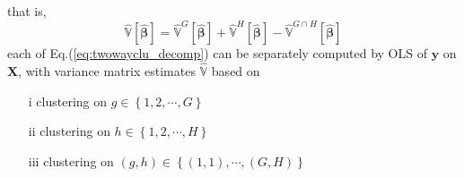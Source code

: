 \documentclass[twoside]{article}
\begin{document}
that is,
\begin{equation}\label{eq:twowayclu_decomp}
    \hat{\mathbb{V}}\left[\hat{\boldsymbol{\beta}}\right] = \hat{\mathbb{V}}^G\left[\hat{\boldsymbol{\beta}}\right] + \hat{\mathbb{V}}^H\left[\hat{\boldsymbol{\beta}}\right] - \hat{\mathbb{V}}^{G\cap H}\left[\hat{\boldsymbol{\beta}}\right]
\end{equation}
each of Eq.(\ref{eq:twowayclu_decomp}) can be separately computed by OLS of $\mathbf{y}$ on $\mathbf{X}$, with variance matrix estimates $\hat{\mathbb{V}}$ based on 
\begin{itemize}
    \item[i] clustering on $g\in \left\{1,2,\cdots, G\right\}$
    \item[ii] clustering on $h \in \left\{1,2,\cdots, H\right\}$
    \item[iii] clustering on $(g,h)\in \left\{(1,1),\cdots,(G,H)\right\}$
\end{itemize}
\end{document}
